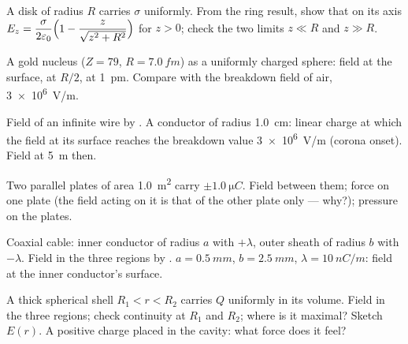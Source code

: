 \begin{exercise}[$\star\star$]\label{exo:b1:electrostatics-gauss:5}
A disk of radius $R$ carries $\sigma$ uniformly. From the ring result,
show that on its axis $E_z = \dfrac{\sigma}{2\varepsilon_0}\Bigl(1 - \dfrac{z}{\sqrt{z^2 +
R^2}}\Bigr)$ for $z > 0$; check the two limits $z \ll R$ and $z \gg R$.
\end{exercise}

\begin{exercise}[$\star\star$]\label{exo:b1:electrostatics-gauss:6}
A gold nucleus ($Z = 79$, $R = \qty{7.0}{fm}$) as a uniformly charged
sphere: field at the surface, at $R/2$, at \qty{1}{pm}. Compare with the
breakdown field of air, \qty{3e6}{V/m}.
\end{exercise}

\begin{exercise}[$\star\star$]\label{exo:b1:electrostatics-gauss:7}
Field of an infinite wire by . A  conductor of
radius \qty{1.0}{cm}: linear charge at which the field at its surface
reaches the breakdown value \qty{3e6}{V/m} (corona onset). Field at
\qty{5}{m} then.
\end{exercise}

\begin{exercise}[$\star\star$]\label{exo:b1:electrostatics-gauss:8}
Two parallel plates of area \qty{1.0}{m^2} carry $\pm\qty{1.0}{\micro C}$.
Field between them; force on one plate (the field acting on it is that
of the other plate only --- why?); pressure on the plates.
\end{exercise}

\begin{exercise}[$\star\star$]\label{exo:b1:electrostatics-gauss:9}
Coaxial cable: inner conductor of radius $a$ with $+\lambda$, outer
sheath of radius $b$ with $-\lambda$. Field in the three regions by
. $a = \qty{0.5}{mm}$, $b = \qty{2.5}{mm}$, $\lambda = \qty{10}{nC/m}$:
field at the inner conductor's surface.
\end{exercise}

\begin{exercise}[$\star\star\star$]\label{exo:b1:electrostatics-gauss:10}
A thick spherical shell $R_1 < r < R_2$ carries $Q$ uniformly in its
volume. Field in the three regions; check continuity at $R_1$ and
$R_2$; where is it maximal? Sketch $E(r)$. A positive charge placed
in the cavity: what force does it feel?
\end{exercise}

